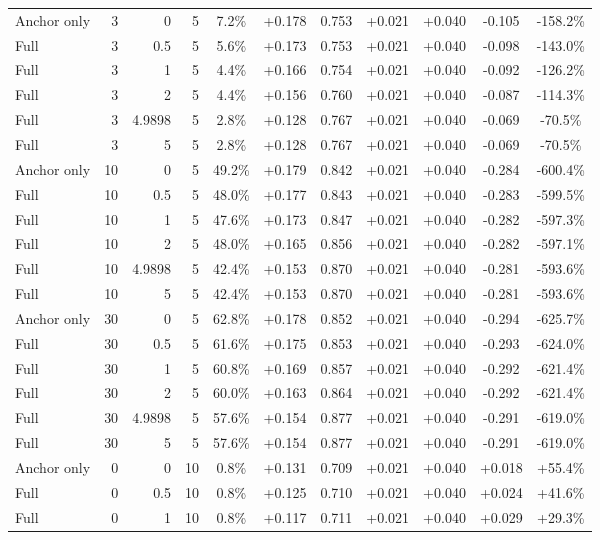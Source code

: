 \begin{table}[htbp]
\begin{tabular}{lrrrccccccc}
Anchor only & 3 & 0 & 5 & 7.2\% & +0.178 & 0.753 & +0.021 & +0.040 & -0.105 & -158.2\% \\
Full & 3 & 0.5 & 5 & 5.6\% & +0.173 & 0.753 & +0.021 & +0.040 & -0.098 & -143.0\% \\
Full & 3 & 1 & 5 & 4.4\% & +0.166 & 0.754 & +0.021 & +0.040 & -0.092 & -126.2\% \\
Full & 3 & 2 & 5 & 4.4\% & +0.156 & 0.760 & +0.021 & +0.040 & -0.087 & -114.3\% \\
Full & 3 & 4.9898 & 5 & 2.8\% & +0.128 & 0.767 & +0.021 & +0.040 & -0.069 & -70.5\% \\
Full & 3 & 5 & 5 & 2.8\% & +0.128 & 0.767 & +0.021 & +0.040 & -0.069 & -70.5\% \\
Anchor only & 10 & 0 & 5 & 49.2\% & +0.179 & 0.842 & +0.021 & +0.040 & -0.284 & -600.4\% \\
Full & 10 & 0.5 & 5 & 48.0\% & +0.177 & 0.843 & +0.021 & +0.040 & -0.283 & -599.5\% \\
Full & 10 & 1 & 5 & 47.6\% & +0.173 & 0.847 & +0.021 & +0.040 & -0.282 & -597.3\% \\
Full & 10 & 2 & 5 & 48.0\% & +0.165 & 0.856 & +0.021 & +0.040 & -0.282 & -597.1\% \\
Full & 10 & 4.9898 & 5 & 42.4\% & +0.153 & 0.870 & +0.021 & +0.040 & -0.281 & -593.6\% \\
Full & 10 & 5 & 5 & 42.4\% & +0.153 & 0.870 & +0.021 & +0.040 & -0.281 & -593.6\% \\
Anchor only & 30 & 0 & 5 & 62.8\% & +0.178 & 0.852 & +0.021 & +0.040 & -0.294 & -625.7\% \\
Full & 30 & 0.5 & 5 & 61.6\% & +0.175 & 0.853 & +0.021 & +0.040 & -0.293 & -624.0\% \\
Full & 30 & 1 & 5 & 60.8\% & +0.169 & 0.857 & +0.021 & +0.040 & -0.292 & -621.4\% \\
Full & 30 & 2 & 5 & 60.0\% & +0.163 & 0.864 & +0.021 & +0.040 & -0.292 & -621.4\% \\
Full & 30 & 4.9898 & 5 & 57.6\% & +0.154 & 0.877 & +0.021 & +0.040 & -0.291 & -619.0\% \\
Full & 30 & 5 & 5 & 57.6\% & +0.154 & 0.877 & +0.021 & +0.040 & -0.291 & -619.0\% \\
Anchor only & 0 & 0 & 10 & 0.8\% & +0.131 & 0.709 & +0.021 & +0.040 & +0.018 & +55.4\% \\
Full & 0 & 0.5 & 10 & 0.8\% & +0.125 & 0.710 & +0.021 & +0.040 & +0.024 & +41.6\% \\
Full & 0 & 1 & 10 & 0.8\% & +0.117 & 0.711 & +0.021 & +0.040 & +0.029 & +29.3\% \\

\end{tabular}
\end{table}
